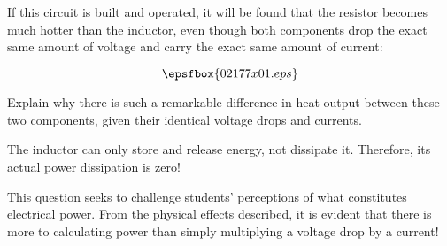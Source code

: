 

If this circuit is built and operated, it will be found that the resistor becomes much hotter than the inductor, even though both components drop the exact same amount of voltage and carry the exact same amount of current:

$$\epsfbox{02177x01.eps}$$

Explain why there is such a remarkable difference in heat output between these two components, given their identical voltage drops and currents.







The inductor can only store and release energy, not dissipate it.  Therefore, its actual power dissipation is zero!







This question seeks to challenge students' perceptions of what constitutes electrical power.  From the physical effects described, it is evident that there is more to calculating power than simply multiplying a voltage drop by a current!




